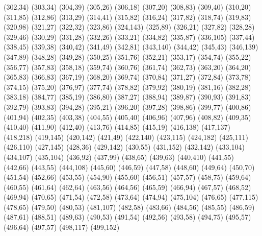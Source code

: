 (302,34)
(303,34)
(304,39)
(305,26)
(306,18)
(307,20)
(308,83)
(309,40)
(310,20)
(311,85)
(312,86)
(313,29)
(314,41)
(315,82)
(316,24)
(317,82)
(318,74)
(319,83)
(320,98)
(321,27)
(322,32)
(323,86)
(324,143)
(325,89)
(326,21)
(327,82)
(328,28)
(329,46)
(330,29)
(331,28)
(332,26)
(333,21)
(334,82)
(335,87)
(336,105)
(337,44)
(338,45)
(339,38)
(340,42)
(341,49)
(342,81)
(343,140)
(344,42)
(345,43)
(346,139)
(347,89)
(348,28)
(349,28)
(350,25)
(351,76)
(352,21)
(353,17)
(354,74)
(355,22)
(356,77)
(357,83)
(358,18)
(359,74)
(360,76)
(361,74)
(362,73)
(363,20)
(364,20)
(365,83)
(366,83)
(367,19)
(368,20)
(369,74)
(370,84)
(371,27)
(372,84)
(373,78)
(374,15)
(375,20)
(376,97)
(377,74)
(378,82)
(379,92)
(380,19)
(381,16)
(382,28)
(383,18)
(384,77)
(385,19)
(386,80)
(387,27)
(388,94)
(389,87)
(390,93)
(391,83)
(392,79)
(393,83)
(394,28)
(395,21)
(396,20)
(397,28)
(398,86)
(399,77)
(400,86)
(401,94)
(402,35)
(403,38)
(404,55)
(405,40)
(406,96)
(407,96)
(408,82)
(409,35)
(410,40)
(411,90)
(412,40)
(413,76)
(414,85)
(415,19)
(416,138)
(417,137)
(418,218)
(419,145)
(420,142)
(421,49)
(422,140)
(423,115)
(424,182)
(425,111)
(426,110)
(427,145)
(428,36)
(429,142)
(430,55)
(431,152)
(432,142)
(433,104)
(434,107)
(435,104)
(436,92)
(437,99)
(438,65)
(439,63)
(440,410)
(441,55)
(442,66)
(443,55)
(444,108)
(445,60)
(446,59)
(447,58)
(448,60)
(449,64)
(450,70)
(451,54)
(452,66)
(453,55)
(454,90)
(455,60)
(456,51)
(457,57)
(458,75)
(459,64)
(460,55)
(461,64)
(462,64)
(463,56)
(464,56)
(465,59)
(466,94)
(467,57)
(468,52)
(469,94)
(470,65)
(471,54)
(472,58)
(473,64)
(474,94)
(475,104)
(476,65)
(477,115)
(478,65)
(479,50)
(480,53)
(481,107)
(482,58)
(483,66)
(484,56)
(485,55)
(486,59)
(487,61)
(488,51)
(489,63)
(490,53)
(491,54)
(492,56)
(493,58)
(494,75)
(495,57)
(496,64)
(497,57)
(498,117)
(499,152)
